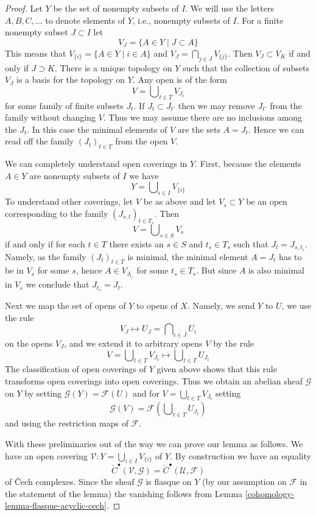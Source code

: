 \begin{proof}

Let $Y$ be the set of nonempty subsets of $I$. We will use the letters
$A, B, C, \ldots$ to denote elements of $Y$, i.e., nonempty subsets of $I$.
For a finite nonempty subset $J \subset I$ let
$$
V_J = \{A \in Y \mid J \subset A\}
$$
This means that $V_{\{i\}} = \{A \in Y \mid i \in A\}$ and
$V_J = \bigcap_{j \in J} V_{\{j\}}$.
Then $V_J \subset V_K$ if and only if $J \supset K$.
There is a unique topology on $Y$ such that the collection of
subsets $V_J$ is a basis for the topology on $Y$. Any open is of the form
$$
V = \bigcup\nolimits_{t \in T} V_{J_t}
$$
for some family of finite subsets $J_t$. If $J_t \subset J_{t'}$
then we may remove $J_{t'}$ from the family without changing $V$.
Thus we may assume there are no inclusions among the $J_t$.
In this case the minimal elements of $V$ are the sets $A = J_t$.
Hence we can read off the family $(J_t)_{t \in T}$ from the open $V$.

\medskip\noindent
We can completely understand open coverings in $Y$. First, because
the elements $A \in Y$ are nonempty subsets of $I$ we have
$$
Y = \bigcup\nolimits_{i \in I} V_{\{i\}}
$$
To understand other coverings, let $V$ be as above and let $V_s \subset Y$
be an open corresponding to the family $(J_{s, t})_{t \in T_s}$. Then
$$
V = \bigcup\nolimits_{s \in S} V_s
$$
if and only if for each $t \in T$ there exists an $s \in S$ and
$t_s \in T_s$ such that $J_t = J_{s, t_s}$. Namely, as the family
$(J_t)_{t \in T}$ is minimal, the minimal element $A = J_t$
has to be in $V_s$ for some $s$, hence $A \in V_{J_{t_s}}$ for some
$t_s \in T_s$. But since $A$ is also minimal in $V_s$ we conclude
that $J_{t_s} = J_t$.

\medskip\noindent
Next we map the set of opens of $Y$ to opens of $X$. Namely, we send
$Y$ to $U$, we use the rule
$$
V_J \mapsto U_J = \bigcap\nolimits_{i \in J} U_i
$$
on the opens $V_J$, and we extend it to arbitrary opens $V$ by the rule
$$
V = \bigcup\nolimits_{t \in T} V_{J_t}
\mapsto
\bigcup\nolimits_{t \in T} U_{J_t}
$$
The classification of open coverings of $Y$ given above shows that
this rule transforms open coverings into open coverings. Thus we obtain
an abelian sheaf $\mathcal{G}$ on $Y$ by setting
$\mathcal{G}(Y) = \mathcal{F}(U)$ and for
$V = \bigcup\nolimits_{t \in T} V_{J_t}$ setting
$$
\mathcal{G}(V) = \mathcal{F}\left(\bigcup\nolimits_{t \in T} U_{J_t}\right)
$$
and using the restriction maps of $\mathcal{F}$.

\medskip\noindent
With these preliminaries out of the way we can prove our lemma as follows.
We have an open covering
$\mathcal{V} : Y = \bigcup_{i \in I} V_{\{i\}}$ of $Y$.
By construction we have an equality
$$
\check{C}^\bullet(\mathcal{V}, \mathcal{G}) =
\check{C}^\bullet(\mathcal{U}, \mathcal{F})
$$
of {\v C}ech complexes. Since the sheaf $\mathcal{G}$ is flasque on $Y$
(by our assumption on $\mathcal{F}$ in the statement of the lemma)
the vanishing follows from
Lemma \ref{cohomology-lemma-flasque-acyclic-cech}.
\end{proof}

